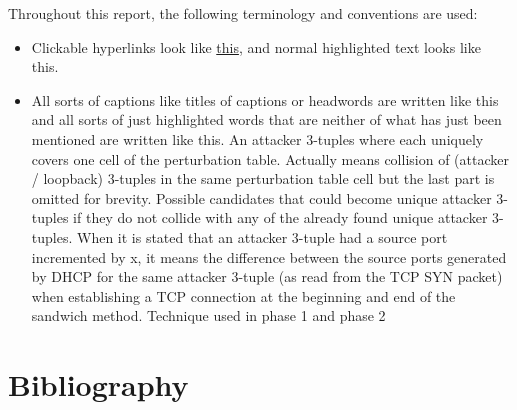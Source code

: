 \documentclass{report}
\begin{document}
Throughout this report, the following terminology and conventions are used:
\begin{itemize}
	\item Clickable hyperlinks look like \hyperref[sec:terminology and conventions]{this}, and normal highlighted text looks like \alert{this}.
	\item All sorts of captions like titles of captions or headwords are written like this  and all sorts of just highlighted words that are neither of what has just been mentioned are written like \alert{this}.
	 An attacker 3-tuples where each uniquely covers one cell of the perturbation table.
	 Actually means collision of (attacker / loopback) 3-tuples in the same perturbation table cell but the last part is omitted for brevity.
	 Possible candidates that could become unique attacker 3-tuples if they do not collide with any of the already found unique attacker 3-tuples.
	 When it is stated that an attacker 3-tuple had a source port incremented by x, it means the difference between the source ports generated by DHCP for the same attacker 3-tuple (as read from the TCP SYN packet) when establishing a TCP connection at the beginning and end of the sandwich method.
	 Technique used in phase 1 and phase 2
\end{itemize}

\vspace{0.5cm}
\chapter{Bibliography}
\label{sec:bibliography}

\printbibliography[heading=none]
\end{document}
